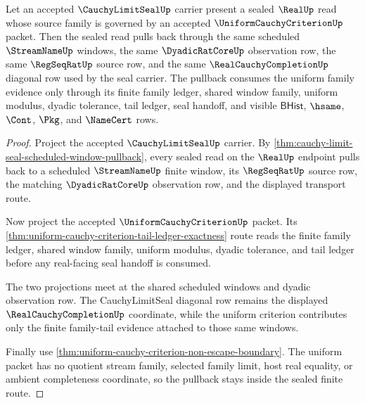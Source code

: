 \begin{theorem}
\label{thm:cauchy-limit-seal-uniform-criterion-pullback}
Let an accepted $\CauchyLimitSealUp$ carrier present a sealed $\RealUp$ read
whose source family is governed by an accepted $\UniformCauchyCriterionUp$
packet. Then the sealed read pulls back through the same scheduled
$\StreamNameUp$ windows, the same $\DyadicRatCoreUp$ observation row, the same
$\RegSeqRatUp$ source row, and the same $\RealCauchyCompletionUp$ diagonal row
used by the seal carrier. The pullback consumes the uniform family evidence
only through its finite family ledger, shared window family, uniform modulus,
dyadic tolerance, tail ledger, seal handoff, and visible $\mathsf{BHist}$,
$\hsame$, $\Cont$, $\Pkg$, and $\NameCert$ rows.
\end{theorem}
\begin{proof}
Project the accepted $\CauchyLimitSealUp$ carrier. By
\autoref{thm:cauchy-limit-seal-scheduled-window-pullback}, every sealed read
on the $\RealUp$ endpoint pulls back to a scheduled $\StreamNameUp$ finite
window, its $\RegSeqRatUp$ source row, the matching $\DyadicRatCoreUp$
observation row, and the displayed transport route.

Now project the accepted $\UniformCauchyCriterionUp$ packet. Its
\autoref{thm:uniform-cauchy-criterion-tail-ledger-exactness} route reads the
finite family ledger, shared window family, uniform modulus, dyadic tolerance,
and tail ledger before any real-facing seal handoff is consumed.

The two projections meet at the shared scheduled windows and dyadic
observation row. The CauchyLimitSeal diagonal row remains the displayed
$\RealCauchyCompletionUp$ coordinate, while the uniform criterion contributes
only the finite family-tail evidence attached to those same windows.

Finally use \autoref{thm:uniform-cauchy-criterion-non-escape-boundary}. The
uniform packet has no quotient stream family, selected family limit, host real
equality, or ambient completeness coordinate, so the pullback stays inside the
sealed finite route.
\end{proof}

